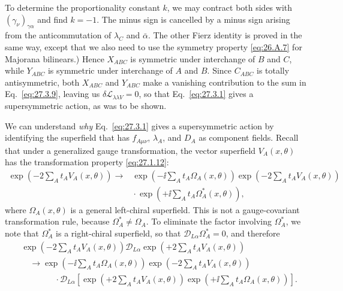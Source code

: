 To determine the proportionality constant \(k\), we may contract both sides
with \((\gamma_\nu)_{\gamma\alpha}\) and find \(k=-1\). The minus sign is
cancelled by a minus sign arising from the anticommutation of \(\lambda_C\)
and \(\bar\alpha\). The other Fierz identity is proved in the same way,
except that we also need to use the symmetry property
\eqref{eq:26.A.7} for Majorana bilinears.) Hence \(X_{ABC}\) is symmetric
under interchange of \(B\) and \(C\), while \(Y_{ABC}\) is symmetric under
interchange of \(A\) and \(B\). Since \(C_{ABC}\) is totally
antisymmetric, both \(X_{ABC}\) and \(Y_{ABC}\) make a vanishing
contribution to the sum in Eq.~\eqref{eq:27.3.9}, leaving us
\(\delta\mathcal{L}_{\lambda\lambda V}=0\), so that
Eq.~\eqref{eq:27.3.1} gives a supersymmetric action, as was to be shown.

We can understand \textit{why} Eq.~\eqref{eq:27.3.1} gives a
supersymmetric action by identifying the superfield that has
\(f_{A\mu\nu}\), \(\lambda_A\), and \(D_A\) as component fields. Recall
that under a generalized gauge transformation, the vector superfield
\(V_A(x,\theta)\) has the transformation property \eqref{eq:27.1.12}:
\begin{equation}
  \begin{aligned}
  \exp\left(-2\sum_A t_A V_A(x,\theta)\right)
  \longrightarrow{}&
  \exp\left(-\ii\sum_A t_A\Omega_A(x,\theta)\right)
  \exp\left(-2\sum_A t_A V_A(x,\theta)\right)
  \\
  &{}\cdot
  \exp\left(+\ii\sum_A t_A\Omega_A^*(x,\theta)\right),
  \end{aligned}
  \tag{27.3.10}\label{eq:27.3.10}
\end{equation}
where \(\Omega_A(x,\theta)\) is a general left-chiral superfield. This is
not a gauge-covariant transformation rule, because
\(\Omega_A^*\ne\Omega_A\). To eliminate the factor involving
\(\Omega_A^*\), we note that \(\Omega_A^*\) is a right-chiral superfield,
so that \(\mathcal{D}_{L\alpha}\Omega_A^*=0\), and therefore
\begin{equation}
  \begin{aligned}
  &\exp\left(-2\sum_A t_A V_A(x,\theta)\right)
  \mathcal{D}_{L\alpha}
  \exp\left(+2\sum_A t_A V_A(x,\theta)\right)
  \\
  &\quad\longrightarrow
  \exp\left(-\ii\sum_A t_A\Omega_A(x,\theta)\right)
  \exp\left(-2\sum_A t_A V_A(x,\theta)\right)
  \\
  &\qquad\qquad{}\cdot
  \mathcal{D}_{L\alpha}\left[
    \exp\left(+2\sum_A t_A V_A(x,\theta)\right)
    \exp\left(+\ii\sum_A t_A\Omega_A(x,\theta)\right)
  \right].
  \end{aligned}
  \tag{27.3.11}\label{eq:27.3.11}
\end{equation}
